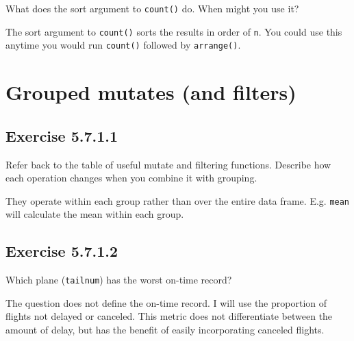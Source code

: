 \documentclass[]{book}
\theoremstyle{plain}
\theoremstyle{remark}
\begin{document}
What does the sort argument to \texttt{count()} do. When might you use
it?

The sort argument to \texttt{count()} sorts the results in order of
\texttt{n}. You could use this anytime you would run \texttt{count()}
followed by \texttt{arrange()}.

\hypertarget{grouped-mutates-and-filters}{%
\section{Grouped mutates (and
filters)}\label{grouped-mutates-and-filters}}

\hypertarget{exercise-5.7.1.1}{%
\subsection*{\texorpdfstring{Exercise
{5.7.1.1}}{Exercise 5.7.1.1}}\label{exercise-5.7.1.1}}

Refer back to the table of useful mutate and filtering functions.
Describe how each operation changes when you combine it with grouping.

They operate within each group rather than over the entire data frame.
E.g. \texttt{mean} will calculate the mean within each group.

\hypertarget{exercise-5.7.1.2}{%
\subsection*{\texorpdfstring{Exercise
{5.7.1.2}}{Exercise 5.7.1.2}}\label{exercise-5.7.1.2}}

Which plane (\texttt{tailnum}) has the worst on-time record?

The question does not define the on-time record. I will use the
proportion of flights not delayed or canceled. This metric does not
differentiate between the amount of delay, but has the benefit of easily
incorporating canceled flights.
\end{document}
